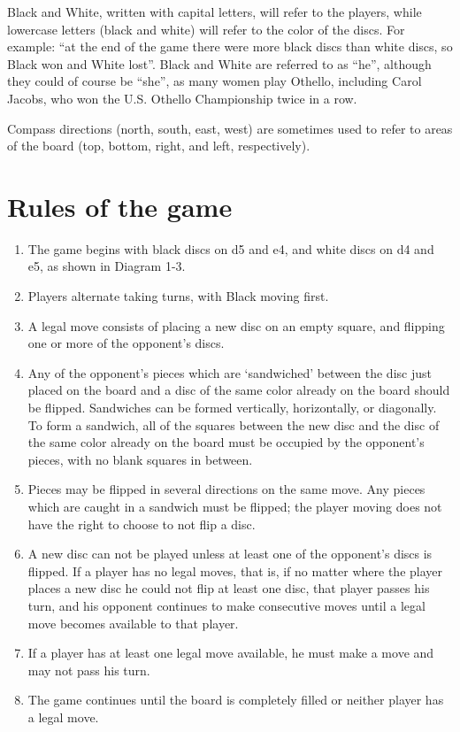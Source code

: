 \documentclass[a4paper,12pt]{book}
\begin{document}
Black and White, written with capital letters, will refer to the players, while
lowercase letters (black and white) will refer to the color of the discs. For example:
``at the end of the game there were more black discs than white discs, so Black won
and White lost''. Black and White are referred to as ``he'', although they could of
course be ``she'', as many women play Othello, including Carol Jacobs, who won the
U.S. Othello Championship twice in a row.

Compass directions (north, south, east, west) are sometimes used to refer to
areas of the board (top, bottom, right, and left, respectively).

\section{Rules of the game}

\begin{enumerate}
\item The game begins with black discs on d5 and e4, and white discs on d4 and e5, as
shown in Diagram 1-3.

\item Players alternate taking turns, with Black moving first.

\item A legal move consists of placing a new disc on an empty square, and flipping
one or more of the opponent's discs.

\item Any of the opponent's pieces which are `sandwiched' between the disc just placed
on the board and a disc of the same color already on the board should be flipped.
Sandwiches can be formed vertically, horizontally, or diagonally. To form a sandwich,
all of the squares between the new disc and the disc of the same color
already on the board must be occupied by the opponent's pieces, with no blank
squares in between.

\item Pieces may be flipped in several directions on the same move. Any pieces which
are caught in a sandwich must be flipped; the player moving does not have the
right to choose to not flip a disc.

\item A new disc can not be played unless at least one of the opponent's discs is
flipped. If a player has no legal moves, that is, if no matter where the player
places a new disc he could not flip at least one disc, that player passes his turn,
and his opponent continues to make consecutive moves until a legal move becomes
available to that player.

\item If a player has at least one legal move available, he must make a move and may
not pass his turn.

\item The game continues until the board is completely filled or neither player has a
legal move.
\end{enumerate}
\end{document}
